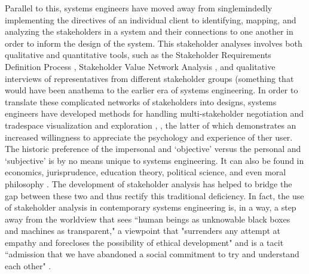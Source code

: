 \documentclass[notitlepage]{article}
\begin{document}
Parallel to this, systems engineers have moved away from singlemindedly implementing the directives of an individual client to identifying, mapping, and analyzing the stakeholders in a system and their connections to one another in order to inform the design of the system. This stakeholder analyses involves both qualitative and quantitative tools, such as the Stakeholder Requirements Definition Process \cite{incoseINCOSESystemsEngineering2015}, Stakeholder Value Network Analysis \cite{fengDependencyStructureMatrix2010a}, and qualitative interviews of representatives from different stakeholder groups (something that would have been anathema to the earlier era of systems engineering. In order to translate these complicated networks of stakeholders into designs, systems engineers have developed methods for handling multi-stakeholder negotiation and \cite{fitzgeraldEffectsEnhancedMultiparty2015,fitzgeraldRecommendationsFramingMultistakeholder2016,weckMULTISTAKEHOLDERSIMULATIONGAMING2012} tradespace visualization and exploration \cite{fitzgeraldEffectsEnhancedMultiparty2015,fitzgeraldRecommendationsFramingMultistakeholder2016,groganInteractiveModelsSystem2015,rossMultiAttributeTradespaceExploration2004,selvavaleroRulebasedSystemArchitecting2012}, , the latter of which demonstrates an increased willingness to appreciate the psychology and experience of ther user. The historic preference of the impersonal and `objective' versus the personal and `subjective' is by no means unique to systems engineering. It can also be found in economics, jurisprudence, education theory, political science, and even moral philosophy \cite{banuriModernatizationItsDiscontents1990}. The development of stakeholder analysis has helped to bridge the gap between these two and thus rectify this traditional deficiency. In fact, the use of stakeholder analysis in contemporary systems engineering is, in a way, a step away from the worldview that sees ``human beings as unknowable black boxes and machines as transparent," a viewpoint that "surrenders any attempt at empathy and forecloses the possibility of ethical development" and is a tacit ``admission that we have abandoned a social commitment to try and understand each other" \cite{eubanksAutomatingInequalityHow2018}.
\end{document}
